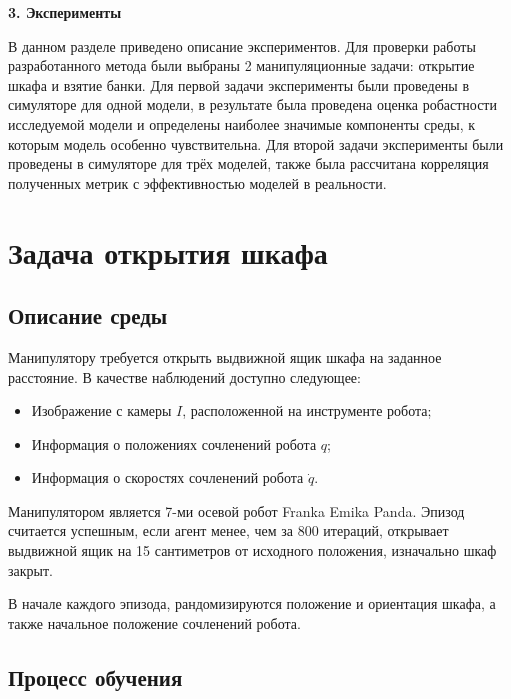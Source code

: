 \newpage
\begin{center}
  \textbf{\large 3. Эксперименты}
\end{center}

В данном разделе приведено описание экспериментов. Для проверки работы разработанного метода были выбраны 2 манипуляционные задачи: открытие шкафа и взятие банки. Для первой задачи эксперименты были проведены в симуляторе для одной модели, в результате была проведена оценка робастности исследуемой модели и определены наиболее значимые компоненты среды, к которым модель особенно чувствительна. Для второй задачи эксперименты были проведены в симуляторе для трёх моделей, также была рассчитана корреляция полученных метрик с эффективностью моделей в реальности. 

\section{Задача открытия шкафа}

    \subsection{Описание среды}

        Манипулятору требуется открыть выдвижной ящик шкафа на заданное расстояние. В качестве наблюдений доступно следующее:

        \begin{itemize}
            \item Изображение с камеры $I$, расположенной на инструменте робота;
            \item Информация о положениях сочленений робота $q$;
            \item Информация о скоростях сочленений робота $\dot{q}$.
        \end{itemize}

        Манипулятором является 7-ми осевой робот Franka Emika Panda. Эпизод считается успешным, если агент менее, чем за 800 итераций, открывает выдвижной ящик на 15 сантиметров от исходного положения, изначально шкаф закрыт. 
        
        В начале каждого эпизода, рандомизируются положение и ориентация шкафа, а также начальное положение сочленений робота. 

    \subsection{Процесс обучения}

